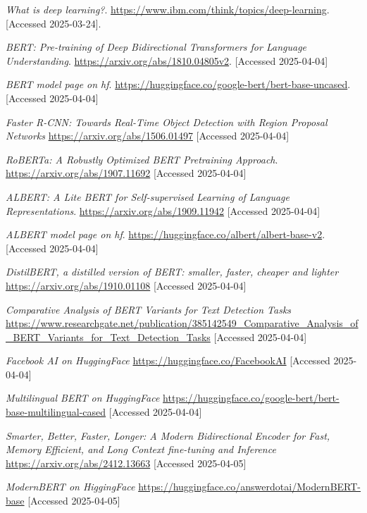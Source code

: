 \documentclass[licencjacka,en]{pracamgr}
\begin{document}
\begin{thebibliography}{99}
\textit{What is deep learning?}.
\url{https://www.ibm.com/think/topics/deep-learning}.
[Accessed 2025-03-24].

\textit{BERT: Pre-training of Deep Bidirectional Transformers for Language Understanding}.
\url{https://arxiv.org/abs/1810.04805v2}.
[Accessed 2025-04-04]

\textit{BERT model page on hf}.
\url{https://huggingface.co/google-bert/bert-base-uncased}.
[Accessed 2025-04-04]

\textit{Faster R-CNN: Towards Real-Time Object Detection with Region Proposal Networks}
\url{https://arxiv.org/abs/1506.01497}
[Accessed 2025-04-04]

\textit{RoBERTa: A Robustly Optimized BERT Pretraining Approach}.
\url{https://arxiv.org/abs/1907.11692}
[Accessed 2025-04-04]

\textit{ALBERT: A Lite BERT for Self-supervised Learning of Language Representations}.
\url{https://arxiv.org/abs/1909.11942}
[Accessed 2025-04-04]

\textit{ALBERT model page on hf}.
\url{https://huggingface.co/albert/albert-base-v2}.
[Accessed 2025-04-04]

\textit{DistilBERT, a distilled version of BERT: smaller, faster, cheaper and lighter}
\url{https://arxiv.org/abs/1910.01108}
[Accessed 2025-04-04]

\textit{Comparative Analysis of BERT Variants for Text Detection Tasks}
\url{https://www.researchgate.net/publication/385142549_Comparative_Analysis_of_BERT_Variants_for_Text_Detection_Tasks}
[Accessed 2025-04-04]

\textit{Facebook AI on HuggingFace}
\url{https://huggingface.co/FacebookAI}
[Accessed 2025-04-04]

\textit{Multilingual BERT on HuggingFace}
\url{https://huggingface.co/google-bert/bert-base-multilingual-cased}
[Accessed 2025-04-04]

\textit{Smarter, Better, Faster, Longer: A Modern Bidirectional Encoder for Fast, Memory Efficient, and Long Context fine-tuning and Inference}
\url{https://arxiv.org/abs/2412.13663}
[Accessed 2025-04-05]

\textit{ModernBERT on HiggingFace}
\url{https://huggingface.co/answerdotai/ModernBERT-base}
[Accessed 2025-04-05]


\end{thebibliography}
\end{document}
